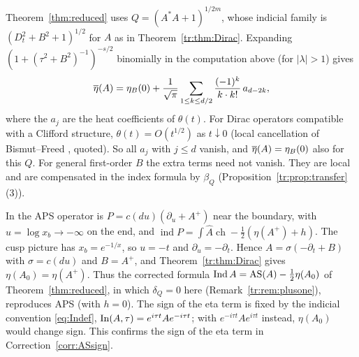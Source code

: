 \begin{remark}\label{tr:rem:plusone}
Theorem~\ref{thm:reduced} uses \(Q=(A^*A+1)^{1/2m}\), whose indicial family
is \((D_t^2+B^2+1)^{1/2}\) for \(A\) as in Theorem~\ref{tr:thm:Dirac}.
Expanding \((1+(\tau^2+B^2)^{-1})^{-s/2}\) binomially in the computation
above (for \(|\lambda|>1\)) gives
\[
 \overline\eta(A)=\eta_B(0)+\frac{1}{\sqrt\pi}\sum_{1\le k\le d/2}\frac{(-1)^k}
 {k\cdot k!}\,a_{d-2k},
\]
where the \(a_j\) are the heat coefficients of \(\theta(t)\). For Dirac
operators compatible with a Clifford structure,
\(\theta(t)=O(t^{1/2})\) as \(t\downarrow0\) (local cancellation of
Bismut--Freed \cite{BismutFreed}, quoted). So all \(a_j\) with \(j\le d\) vanish, and
\(\overline\eta(A)=\eta_B(0)\) also for this \(Q\). For general first-order \(B\)
the extra terms need not vanish. They are local and are compensated in the
index formula by \(\beta_Q\) (Proposition~\ref{tr:prop:transfer}(3)).
\end{remark}

\begin{remark}[Signs]\label{tr:rem:signs}
In \cite{Notes} the APS operator is \(P=c(du)(\partial_u+A^+)\) near the
boundary, with \(u=\log x_b\to-\infty\) on the end, and
\(\operatorname{ind}P=\int\hat A\operatorname{ch}-\frac12(\eta(A^+)+h)\).
The cusp picture has \(x_b=e^{-1/x}\), so \(u=-t\) and
\(\partial_u=-\partial_t\). Hence \(A=\sigma(-\partial_t+B)\) with
\(\sigma=c(du)\) and \(B=A^+\), and Theorem~\ref{tr:thm:Dirac} gives
\(\eta(A_0)=\eta(A^+)\). Thus the corrected formula
\(\operatorname{Ind} A=\mathrm{AS}(A)-\frac12\eta(A_0)\) of Theorem~\ref{thm:reduced}, in which
\(\delta_Q=0\) here (Remark~\ref{tr:rem:plusone}), reproduces
APS (with \(h=0\)). The sign of the eta term is fixed by the indicial
convention \eqref{eq:Indef}, \(\operatorname{In}(A,\tau)=e^{i\tau t}Ae^{-i\tau t}\); with
\(e^{-i\tau t}Ae^{i\tau t}\) instead, \(\eta(A_0)\) would change sign. This
confirms the sign of the eta term in Correction~\ref{corr:ASsign}.
\end{remark}
